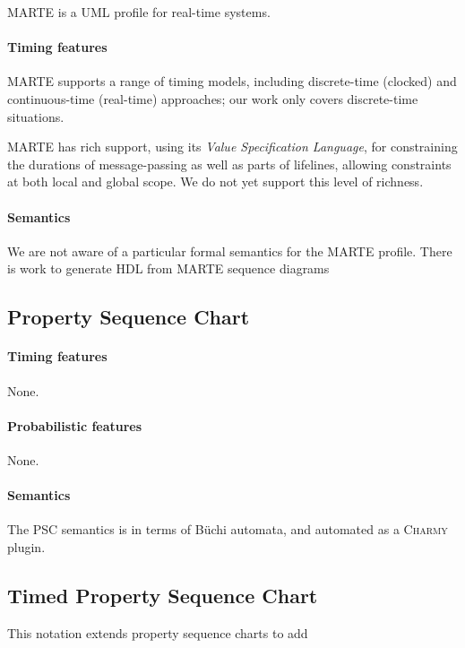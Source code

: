 MARTE is a UML profile for real-time systems.

\paragraph{Timing features}
MARTE supports a range of timing models, including discrete-time (clocked) and
continuous-time (real-time) approaches; our work only covers discrete-time
situations.

MARTE has rich support, using its \emph{Value Specification Language}, for
constraining the durations of message-passing as well as parts of lifelines,
allowing constraints at both local
and global scope.  We do not yet support this level of richness.

\paragraph{Semantics}
We are not aware of a particular formal semantics for the MARTE profile.
There is work to generate HDL from MARTE sequence diagrams~

\subsection{Property Sequence Chart}


\paragraph{Timing features}
None.

\paragraph{Probabilistic features}
None.

\paragraph{Semantics}
The PSC semantics is in terms of B\"uchi automata, and automated as a
\textsc{Charmy} plugin.

\subsection{Timed Property Sequence Chart}
This notation extends property sequence charts to add 

